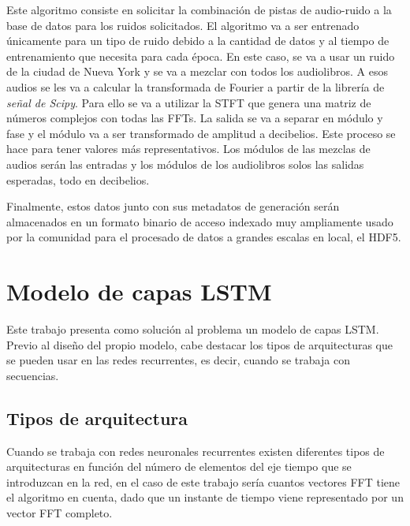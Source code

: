 Este algoritmo consiste en solicitar la combinación de pistas de audio-ruido a la base de datos para los ruidos solicitados. El algoritmo va a ser entrenado únicamente para un tipo de ruido debido a la cantidad de datos y al tiempo de entrenamiento que necesita para cada época. En este caso, se va a usar un ruido de la ciudad de Nueva York y se va a mezclar con todos los audiolibros. A esos audios se les va a calcular la transformada de Fourier a partir de la librería de \textit{señal de Scipy}. Para ello se va a utilizar la \gls{STFT} que genera una matriz de números complejos con todas las \glspl{FFT}. La salida se va a separar en módulo y fase y el módulo va a ser transformado de amplitud a decibelios. Este proceso se hace para tener valores más representativos. Los módulos de las mezclas de audios serán las entradas y los módulos de los audiolibros solos las salidas esperadas, todo en decibelios.

Finalmente, estos datos junto con sus metadatos de generación serán almacenados en un formato binario de acceso indexado muy ampliamente usado por la comunidad para el procesado de datos a grandes escalas en local, el \gls{HDF5}.

\section{Modelo de capas \acrshort{LSTM}}
Este trabajo presenta como solución al problema un modelo de capas \gls{LSTM}. Previo al diseño del propio modelo, cabe destacar los tipos de arquitecturas que se pueden usar en las redes recurrentes, es decir, cuando se trabaja con secuencias.
\subsection{Tipos de arquitectura}
Cuando se trabaja con redes neuronales recurrentes existen diferentes tipos de arquitecturas en función del número de elementos del eje tiempo que se introduzcan en la red, en el caso de este trabajo sería cuantos vectores \gls{FFT} tiene el algoritmo en cuenta, dado que un instante de tiempo viene representado por un vector \gls{FFT} completo.

